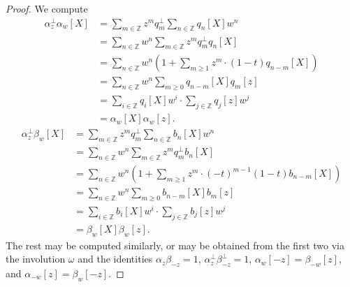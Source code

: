 \documentclass[10pt,a4paper]{amsart}
\newcommand{\Z}{\mathbb{Z}}
\begin{document}
    \begin{proof}
        We compute
        \begin{align*}
            \alpha_z^\perp \alpha_w[X]&=\sum_{m\in\Z}z^mq_m^\perp\sum_{n\in\Z}q_n[X]w^n\\
            &=\sum_{n\in\Z}w^n\sum_{m\in\Z}z^m q_m^\perp q_n[X]\\
            &=\sum_{n\in\Z}w^n\left(1+\sum_{m\geq1}z^m\cdot(1-t)q_{n-m}[X]\right)\\
            &=\sum_{n\in\Z}w^n\sum_{m\geq0}q_{n-m}[X]q_m[z]\\
            &=\sum_{i\in\Z}q_i[X]w^i\cdot \sum_{j\in\Z}q_j[z]w^j\\
            &=\alpha_w[X]\alpha_w[z].
        \end{align*}
        \begin{align*}
            \alpha_z^\perp \beta_w[X]&=\sum_{m\in\Z}z^mq_m^\perp\sum_{n\in\Z}b_n[X]w^n\\
            &=\sum_{n\in\Z}w^n\sum_{m\in\Z}z^m q_m^\perp b_n[X]\\
            &=\sum_{n\in\Z}w^n\left(1+\sum_{m\geq1}z^m\cdot(-t)^{m-1}(1-t)b_{n-m}[X]\right)\\
            &=\sum_{n\in\Z}w^n\sum_{m\geq0}b_{n-m}[X]b_m[z]\\
            &=\sum_{i\in\Z}b_i[X]w^i\cdot \sum_{j\in\Z}b_j[z]w^j\\
            &=\beta_w[X]\beta_w[z].
        \end{align*}
        The rest may be computed similarly, or may be obtained from the first two via the involution $\omega$ and the identities $\alpha_z\beta_{-z}=1$, $\alpha_z^\perp\beta_{-z}^\perp=1$, $\alpha_w[-z]=\beta_{-w}[z]$, and $\alpha_{-w}[z]=\beta_w[-z]$.

\end{proof}
\end{document}
